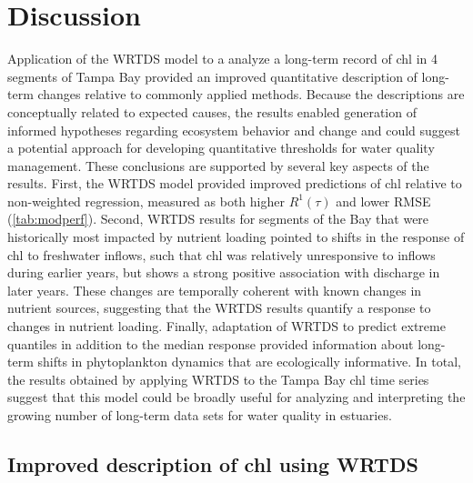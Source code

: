 \documentclass{svjour3}\usepackage[]{graphicx}\usepackage[]{color}
\begin{document}
\section{Discussion}

Application of the \acf{WRTDS} model to a analyze a long-term record of \ac{chl} in 4 segments of Tampa Bay provided an improved quantitative description of long-term changes relative to commonly applied methods.  Because the descriptions are conceptually related to expected causes, the results enabled generation of informed hypotheses regarding ecosystem behavior and change and could suggest a potential approach for developing quantitative thresholds for water quality management.   These conclusions are supported by several key aspects of the results.  First, the \ac{WRTDS} model provided improved predictions of \ac{chl} relative to non-weighted regression, measured as both higher $R^1\left(\tau\right)$ and lower \ac{RMSE} (\cref{tab:modperf}).  Second, \ac{WRTDS} results for segments of the Bay that were historically most impacted by nutrient loading pointed to shifts in the response of \ac{chl} to freshwater inflows, such that \ac{chl} was relatively unresponsive to inflows during earlier years, but shows a strong positive association with discharge in later years.  These changes are temporally coherent with known changes in nutrient sources, suggesting that the \ac{WRTDS} results quantify a response to changes in nutrient loading.  Finally, adaptation of \ac{WRTDS} to predict extreme quantiles in addition to the median response provided information about long-term shifts in phytoplankton dynamics that are ecologically informative.  In total, the results obtained by applying \ac{WRTDS} to the Tampa Bay \ac{chl} time series suggest that this model could be broadly useful for analyzing and interpreting the growing number of long-term data sets for water quality in estuaries.

\subsection{Improved description of \ac{chl} using \ac{WRTDS}}
\end{document}
